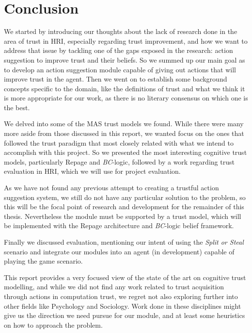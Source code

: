 \section{Conclusion}
\label{sec:Conclusion}
We started by introducing our thoughts about the lack of research done in the area of trust in \ac{HRI}, especially regarding trust improvement, and how we want to address that issue by tackling one of the gaps exposed in the research: action suggestion to improve trust and their beliefs. So we summed up our main goal as to develop an action suggestion module capable of giving out actions that will improve trust in the agent. Then we went on to establish some background concepts specific to the domain, like the definitions of trust and what we think it is more appropriate for our work, as there is no literary consensus on which one is the best. 

We delved into some of the \ac{MAS} trust models we found. While there were many more aside from those discussed in this report, we wanted focus on the ones that followed the trust paradigm that most closely related with what we intend to accomplish with this project. So we presented the most interesting cognitive trust models, particularly Repage and \textit{BC}-logic, followed by a work regarding trust evaluation in \ac{HRI}, which we will use for project evaluation.

As we have not found any previous attempt to creating a trustful action suggestion system, we still do not have any particular solution to the problem, so this will be the focal point of research and development for the remainder of this thesis. Nevertheless the module must be supported by a trust model, which will be implemented with the Repage architecture and \textit{BC}-logic belief framework.

Finally we discussed evaluation, mentioning our intent of using the \textit{Split or Steal} scenario and integrate our modules into an agent (in development) capable of playing the game scenario.

This report provides a very focused view of the state of the art on cognitive trust modelling, and while we did not find any work related to trust acquisition through actions in computation trust, we regret not also exploring further into other fields like Psychology and Sociology. Work done in these disciplines might give us the direction we need pursue for our module, and at least some heuristics on how to approach the problem.